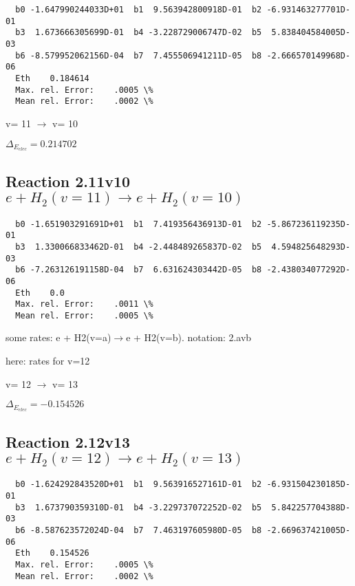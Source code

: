 \documentclass[12pt,dvipdfmx]{article}
\begin{document}
\begin{small}\begin{verbatim}
  b0 -1.647990244033D+01  b1  9.563942800918D-01  b2 -6.931463277701D-01
  b3  1.673666305699D-01  b4 -3.228729006747D-02  b5  5.838404584005D-03
  b6 -8.579952062156D-04  b7  7.455506941211D-05  b8 -2.666570149968D-06
  Eth    0.184614
  Max. rel. Error:    .0005 \%
  Mean rel. Error:    .0002 \%

\end{verbatim}\end{small}

  v=  11 $\rightarrow$ v= 10

$\Delta_{E_{elec}}= 0.214702$


\subsection{
Reaction 2.11v10
$ e + H_2(v=11) \rightarrow e + H_2(v=10) $
}


\begin{small}\begin{verbatim}
  b0 -1.651903291691D+01  b1  7.419356436913D-01  b2 -5.867236119235D-01
  b3  1.330066833462D-01  b4 -2.448489265837D-02  b5  4.594825648293D-03
  b6 -7.263126191158D-04  b7  6.631624303442D-05  b8 -2.438034077292D-06
  Eth    0.0
  Max. rel. Error:    .0011 \%
  Mean rel. Error:    .0005 \%

\end{verbatim}\end{small}

\newpage
some rates: e + H2(v=a)$\rightarrow$e + H2(v=b). notation: 2.avb

here: rates for v=12


  v=  12 $\rightarrow$ v= 13

$\Delta_{E_{elec}}=-0.154526$


\subsection{
Reaction 2.12v13
$ e + H_2(v=12) \rightarrow e + H_2(v=13) $
}


\begin{small}\begin{verbatim}
  b0 -1.624292843520D+01  b1  9.563916527161D-01  b2 -6.931504230185D-01
  b3  1.673790359310D-01  b4 -3.229737072252D-02  b5  5.842257704388D-03
  b6 -8.587623572024D-04  b7  7.463197605980D-05  b8 -2.669637421005D-06
  Eth    0.154526
  Max. rel. Error:    .0005 \%
  Mean rel. Error:    .0002 \%

\end{verbatim}\end{small}
\end{document}
